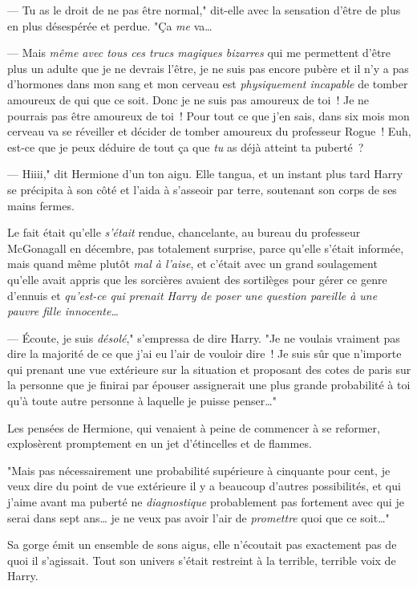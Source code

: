 --- Tu as le droit de ne pas être normal," dit-elle avec la sensation d'être de plus en plus désespérée et perdue. "Ça \emph{me} va…

--- Mais \emph{même avec tous ces trucs magiques bizarres} qui me permettent d'être plus un adulte que je ne devrais l'être, je ne suis pas encore pubère et il n'y a pas d'hormones dans mon sang et mon cerveau est \emph{physiquement incapable} de tomber amoureux de qui que ce soit. Donc je ne suis pas amoureux de toi~! Je ne pourrais pas être amoureux de toi~! Pour tout ce que j'en sais, dans six mois mon cerveau va se réveiller et décider de tomber amoureux du professeur Rogue~! Euh, est-ce que je peux déduire de tout ça que \emph{tu} as déjà atteint ta puberté~?

--- Hiiii," dit Hermione d'un ton aigu. Elle tangua, et un instant plus tard Harry se précipita à son côté et l'aida à s'asseoir par terre, soutenant son corps de ses mains fermes.

Le fait était qu'elle \emph{s'était} rendue, chancelante, au bureau du professeur McGonagall en décembre, pas totalement surprise, parce qu'elle s'était informée, mais quand même plutôt \emph{mal à l'aise}, et c'était avec un grand soulagement qu'elle avait appris que les sorcières avaient des sortilèges pour gérer ce genre d'ennuis et \emph{qu'est-ce qui prenait Harry de poser une question pareille à une pauvre fille innocente…}

--- Écoute, je suis \emph{désolé}," s'empressa de dire Harry. "Je ne voulais vraiment pas dire la majorité de ce que j'ai eu l'air de vouloir dire~! Je suis sûr que n'importe qui prenant une vue extérieure sur la situation et proposant des cotes de paris sur la personne que je finirai par épouser assignerait une plus grande probabilité à toi qu'à toute autre personne à laquelle je puisse penser…"

Les pensées de Hermione, qui venaient à peine de commencer à se reformer, explosèrent promptement en un jet d'étincelles et de flammes.

"Mais pas nécessairement une probabilité supérieure à cinquante pour cent, je veux dire du point de vue extérieure il y a beaucoup d'autres possibilités, et qui j'aime avant ma puberté ne \emph{diagnostique} probablement pas fortement avec qui je serai dans sept ans… je ne veux pas avoir l'air de \emph{promettre} quoi que ce soit…"

Sa gorge émit un ensemble de sons aigus, elle n'écoutait pas exactement pas de quoi il s'agissait. Tout son univers s'était restreint à la terrible, terrible voix de Harry.


